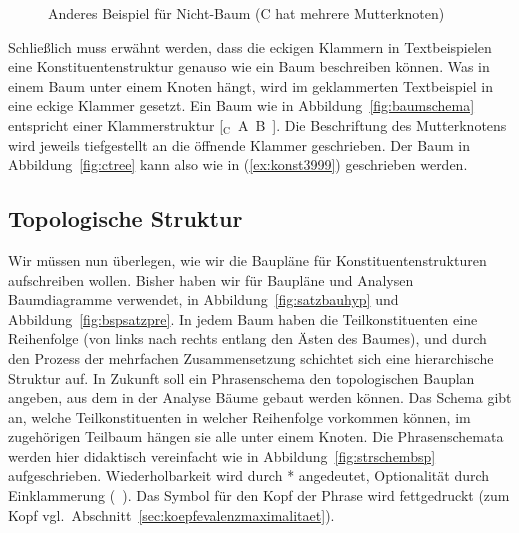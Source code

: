 \begin{figure}
  \centering
  \caption[Anderes Beispiel für Nicht-Baum]{Anderes Beispiel für Nicht-Baum (C hat mehrere Mutterknoten)}
  \label{fig:notree2}
\end{figure}

Schließlich muss erwähnt werden, dass die eckigen Klammern in Textbeispielen eine Konstituentenstruktur genauso wie ein Baum beschreiben können.
Was in einem Baum unter einem Knoten hängt, wird im geklammerten Textbeispiel in eine eckige Klammer gesetzt.
Ein Baum wie in Abbildung~\ref{fig:baumschema} entspricht einer Klammerstruktur [$_\mathrm{C}$~A~B~].
Die Beschriftung des Mutterknotens wird jeweils tiefgestellt an die öffnende Klammer geschrieben.
Der Baum in Abbildung~\ref{fig:ctree} kann also wie in (\ref{ex:konst3999}) geschrieben werden.

\begin{exe}
  \ex{\label{ex:konst3999} [$_\textrm{C}$~A~[$_\textrm{B}$~D~E~F~]~]}
\end{exe}

\subsection{Topologische Struktur}

\label{sec:topologische}

Wir müssen nun überlegen, wie wir die Baupläne für Konstituentenstrukturen aufschreiben wollen.
Bisher haben wir für Baupläne und Analysen Baumdiagramme verwendet, \zB in Abbildung~\ref{fig:satzbauhyp} und Abbildung~\ref{fig:bspsatzpre}.
In jedem Baum haben die Teilkonstituenten eine Reihenfolge (von links nach rechts entlang den Ästen des Baumes), und durch den Prozess der mehrfachen Zusammensetzung schichtet sich eine hierarchische Struktur auf.
In Zukunft soll ein Phrasenschema den topologischen Bauplan angeben, aus dem in der Analyse Bäume gebaut werden können.
Das Schema gibt an, welche Teilkonstituenten in welcher Reihenfolge vorkommen können, im zugehörigen Teilbaum hängen sie alle unter einem Knoten.
Die Phrasenschemata werden hier didaktisch vereinfacht wie in Abbildung~\ref{fig:strschembsp} aufgeschrieben.
Wiederholbarkeit wird durch * angedeutet, Optionalität durch Einklammerung (\ ).
Das Symbol für den Kopf der Phrase wird fettgedruckt (zum Kopf vgl.\ Abschnitt~\ref{sec:koepfevalenzmaximalitaet}).

